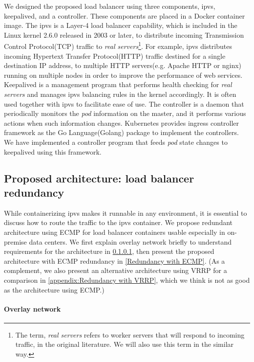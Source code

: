 We designed the proposed load balancer using three components, ipvs, keepalived, and a controller. 
These components are placed in a Docker container image.
The ipvs is a Layer-4 load balancer capability, which is included in the Linux kernel 2.6.0 released in 2003 or later, 
to distribute incoming Transmission Control Protocol(TCP) traffic to 
{\em real servers}\footnote{The term, {\em real servers} refers to worker servers that will respond to incoming traffic, 
in the original literature\cite{Zhang2000}. We will also use this term in the similar way.}\cite{Zhang2000}. 
For example, ipvs distributes incoming Hypertext Transfer Protocol(HTTP) traffic destined for a single destination IP address, 
to multiple HTTP servers(e.g. Apache HTTP or nginx) running on multiple nodes in order to improve the performance of web services.
Keepalived is a management program that performs health checking for {\em real servers}
and manages ipvs balancing rules in the kernel accordingly.
It is often used together with ipvs to facilitate ease of use.
The controller is a daemon that periodically monitors the {\em pod} information on the master, 
and it performs various actions when such information changes.
Kubernetes provides ingress controller framework as the Go Language(Golang) package to implement the controllers. 
We have implemented a controller program that feeds {\em pod} state changes to keepalived 
using this framework. 

\subsection{Proposed architecture: load balancer redundancy}

While containerizing ipvs makes it runnable in any environment, it is essential to discuss how to route the traffic to the ipvs container.
We propose redundant architecture using ECMP for load balancer containers usable especially in on-premise data centers.
We first explain overlay network briefly to understand requirements for the architecture in \ref{Overlay network}, then present the proposed architecture with ECMP redundancy in \ref{Redundancy with ECMP}. 
(As a complement, we also present an alternative architecture using VRRP for a comparison in \ref{appendix:Redundancy with VRRP}, which we think is not as good as the architecture using ECMP.)

\paragraph{\bf Overlay network}\label{Overlay network}

